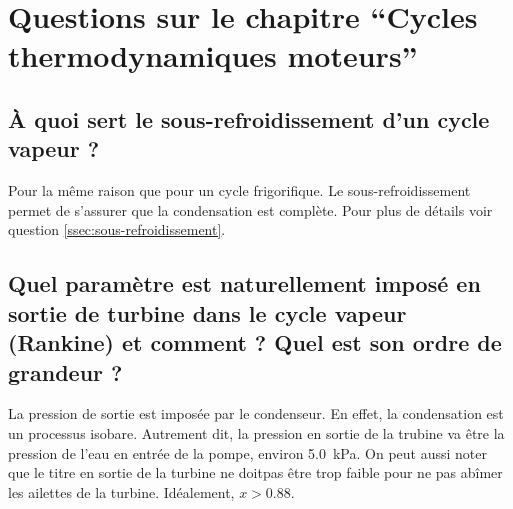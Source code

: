 \section{Questions sur le chapitre ``Cycles thermodynamiques moteurs''}
\subsection{À quoi sert le sous-refroidissement d'un cycle vapeur ?}
Pour la même raison que pour un cycle frigorifique. Le sous-refroidissement permet de s'assurer que la condensation est complète. Pour plus de détails voir question \ref{ssec:sous-refroidissement}.

\subsection{Quel paramètre est naturellement imposé en sortie de turbine dans le cycle vapeur (Rankine) et comment ? Quel est son ordre de grandeur ?}
La pression de sortie est imposée par le condenseur. En effet, la condensation est un processus isobare. Autrement dit, la pression en sortie de la trubine va être la pression de l'eau en entrée de la pompe, environ \SI{5.0}{\kilo\pascal}. On peut aussi noter que le titre en sortie de la turbine ne doitpas être trop faible pour ne pas abîmer les ailettes de la turbine. Idéalement, $x > 0.88$. 
